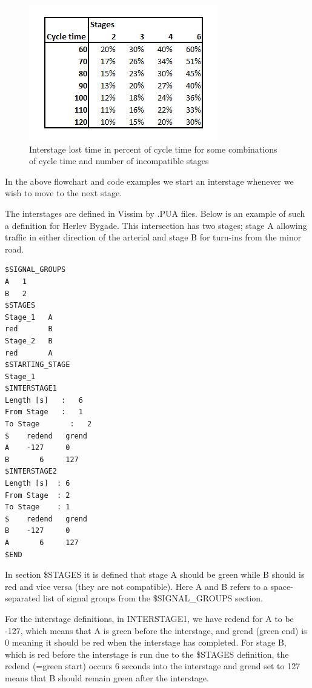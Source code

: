 \begin{figure}[!ht]
\begin{center}
\includegraphics[scale=0.6]{interstage_lost_time.png} 
\end{center}
\caption{Interstage lost time in percent of cycle time for some combinations of cycle time and number of incompatible stages}
\label{fig:lost_time_example}
\end{figure}

In the above flowchart and code examples we start an interstage whenever we wish to move to the next stage.

The interstages are defined in Vissim by .PUA files. Below is an example of such a definition for Herlev Bygade. This intersection has two stages; stage A allowing traffic in either direction of the arterial and stage B for turn-ins from the minor road. 

\begin{verbatim}
$SIGNAL_GROUPS
A   1
B   2
$STAGES
Stage_1   A
red       B
Stage_2   B
red       A
$STARTING_STAGE
Stage_1
$INTERSTAGE1
Length [s]	 :   6
From Stage	 :   1
To Stage	   :   2
$    redend   grend
A    -127     0
B       6     127
$INTERSTAGE2
Length [s]	: 6
From Stage	: 2
To Stage	: 1
$    redend   grend
B    -127     0
A       6     127
$END
\end{verbatim}

In section \$STAGES it is defined that stage A should be green while B should is red and vice versa (they are not compatible). Here A and B refers to a space-separated list of signal groups from the \$SIGNAL\_GROUPS section.

For the interstage definitions, in INTERSTAGE1, we have redend for A to be -127, which means that A is green before the interstage, and grend (green end) is 0 meaning it should be red when the interstage has completed. For stage B, which is red before the interstage is run due to the \$STAGES definition, the redend (=green start) occurs 6 seconds into the interstage and grend set to 127 means that B should remain green after the interstage.

